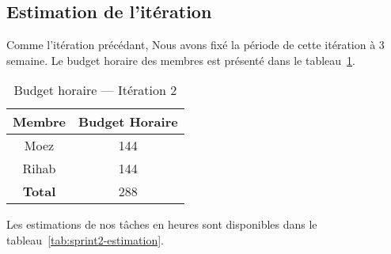\subsection{Estimation de l'itération}

Comme l'itération précédant, Nous avons fixé la période de cette itération à 3
semaine. Le budget horaire des membres est présenté dans le
tableau~\ref{tab:sprint2-capacity}.

\begin{table}[htbp]
    \centering
    \begin{tabular}{| c | c |}
        \hline
        \textbf{Membre} & \textbf{Budget Horaire} \\ \hline
        \hline
Moez & 144 \\ \hline
Rihab & 144 \\ \hline
\textbf{Total} & 288 \\ \hline
    \end{tabular}
    \caption{Budget horaire --- Itération 2}
\label{tab:sprint2-capacity}
\end{table}

Les estimations de nos tâches en heures sont disponibles dans le
tableau~\ref{tab:sprint2-estimation}.

